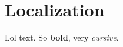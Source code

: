 \documentclass[Main]{subfiles}
\begin{document}
\section{Localization} %
	\label{sec:localization}

	Lol text.
	So \textbf{bold}, very \emph{cursive}.

\end{document}
